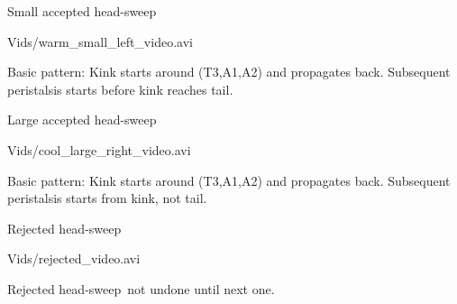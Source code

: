 \documentclass{beamer}%
\newcommand{\hs}{head-sweep}
\begin{document}

\begin{frame}{Small accepted \hs}
%
 \begin{center}
   \movie[width=315px,height=188px,showcontrols=true,loop,poster,autostart]{}
   {Vids/warm_small_left_video.avi}
 \end{center}

 Basic pattern: Kink starts around (T3,A1,A2) and propagates back.
 Subsequent peristalsis starts before kink reaches tail.
%
\end{frame}


\begin{frame}{Large accepted \hs}
%
 \begin{center}
   \movie[width=315px,height=188px,showcontrols=true,loop,poster,autostart]{}
   {Vids/cool_large_right_video.avi}
 \end{center}

 Basic pattern: Kink starts around (T3,A1,A2) and propagates back.
 Subsequent peristalsis starts from kink, not tail.
%
\end{frame}


\begin{frame}{Rejected \hs}
%
 \begin{center}
   \movie[width=315px,height=188px,showcontrols=true,loop,poster]{}
   {Vids/rejected_video.avi}
 \end{center}
 Rejected \hs\ not undone until next one.
%
\end{frame}
\end{document}
